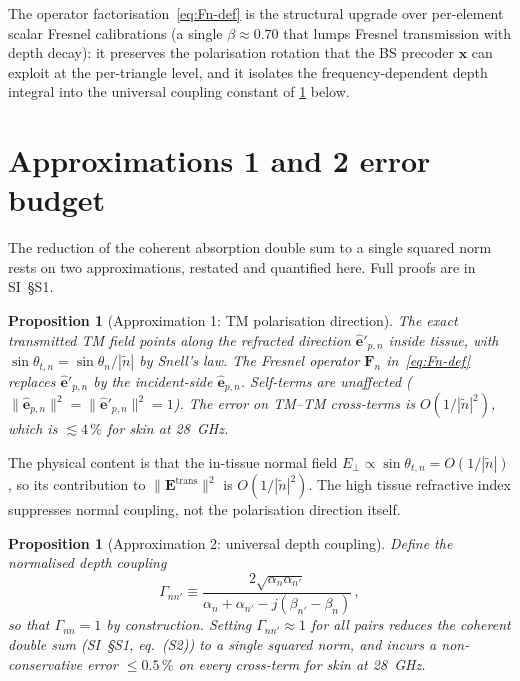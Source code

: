 \documentclass[journal,twocolumn,10pt]{IEEEtran}
\theoremstyle{plain}
\newtheorem{proposition}[theorem]{Proposition}
\theoremstyle{definition}
\theoremstyle{remark}
\newcommand{\EE}{\mathbf{E}}
\newcommand{\Fn}{\mathbf{F}_n}
\newcommand{\ntilde}{\tilde{n}}
\begin{document}
The operator factorisation~\eqref{eq:Fn-def} is the structural
upgrade over per-element scalar Fresnel calibrations (a single
$\beta\approx 0.70$ that lumps Fresnel transmission with depth
decay): it preserves the polarisation rotation that the BS
precoder $\bm{x}$ can exploit at the per-triangle level, and it
isolates the frequency-dependent depth integral into the universal
coupling constant of \cref{prop:approx2-app} below.

\section{Approximations 1 and 2 error budget}\label{app:approxs}

The reduction of the coherent absorption double sum to a single
squared norm rests on two approximations, restated and quantified
here. Full proofs are in SI~\S{}S1.

\begin{proposition}[Approximation 1: TM polarisation direction]
\label{prop:approx1-app}
The exact transmitted TM field points along the refracted direction
$\hat{\bm{e}}'_{p,n}$ inside tissue, with
$\sin\theta_{t,n} = \sin\theta_n / |\ntilde|$ by Snell's law. The
Fresnel operator $\Fn$ in~\eqref{eq:Fn-def} replaces
$\hat{\bm{e}}'_{p,n}$ by the incident-side $\hat{\bm{e}}_{p,n}$.
Self-terms are unaffected
($\|\hat{\bm{e}}_{p,n}\|^2 = \|\hat{\bm{e}}'_{p,n}\|^2 = 1$).
The error on TM--TM cross-terms is $O(1/|\ntilde|^2)$, which is
$\lesssim 4\,\%$ for skin at 28~GHz.
\end{proposition}

The physical content is that the in-tissue normal field
$E_\perp \propto \sin\theta_{t,n} = O(1/|\ntilde|)$, so its
contribution to $\|\EE^{\mathrm{trans}}\|^2$ is $O(1/|\ntilde|^2)$.
The high tissue refractive index suppresses normal coupling, not
the polarisation direction itself.

\begin{proposition}[Approximation 2: universal depth coupling]
\label{prop:approx2-app}
Define the normalised depth coupling
\begin{equation}\label{eq:Gamma-app}
  \Gamma_{nn'} \equiv
    \frac{2\sqrt{\alpha_n\alpha_{n'}}}
         {\alpha_n + \alpha_{n'} - j(\beta_{n'} - \beta_n)}\,,
\end{equation}
so that $\Gamma_{nn} = 1$ by construction. Setting
$\Gamma_{nn'} \approx 1$ for all pairs reduces the coherent double
sum (SI~\S{}S1, eq.~(S2)) to a single squared norm,
and incurs a non-conservative error $\leq 0.5\,\%$ on every
cross-term for skin at 28~GHz.
\end{proposition}
\end{document}
